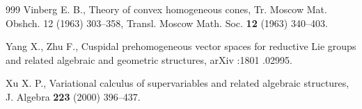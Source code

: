 \documentclass[12pt]{amsart}
\begin{document}
\begin{thebibliography}{999}
 Vinberg E. B., Theory of convex homogeneous cones, Tr. Moscow Mat. Obshch. 12 (1963) 303--358, Transl. Moscow Math. Soc. {\bf 12} (1963) 340--403.

 Yang X., Zhu F., Cuspidal prehomogeneous vector spaces for reductive Lie groups and related algebraic and geometric structures, arXiv :1801 .02995.

 Xu X. P., Variational calculus of supervariables and related algebraic structures, J. Algebra {\bf 223} (2000) 396--437.


\end{thebibliography}
\end{document}
